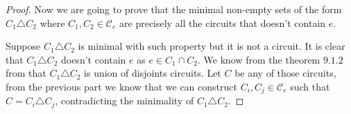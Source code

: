 \begin{proof}
    Now we are going to prove that the minimal non-empty sets of the form $C_1 \triangle C_2$ where $C_1, C_2 \in \mathcal{C}_e$ are precisely all the 
    circuits that doesn't contain $e$.\pn
    
    Suppose $C_1 \triangle C_2$ is minimal with such property but it is not a circuit. It is clear that $C_1 \triangle C_2$ doesn't contain $e$ as
    $e \in C_1 \cap C_2$. We know from the theorem $9.1.2$ from \cite{Oxley}  that $C_1 \triangle C_2$ is union of disjoints circuits. Let $C$ be
    any of those circuits, from the previous part we know that we can construct $C_i, C_j \in \mathcal{C}_e$ such that $C = C_i \triangle C_j$, contradicting
    the minimality of $C_1 \triangle C_2$.
\end{proof}